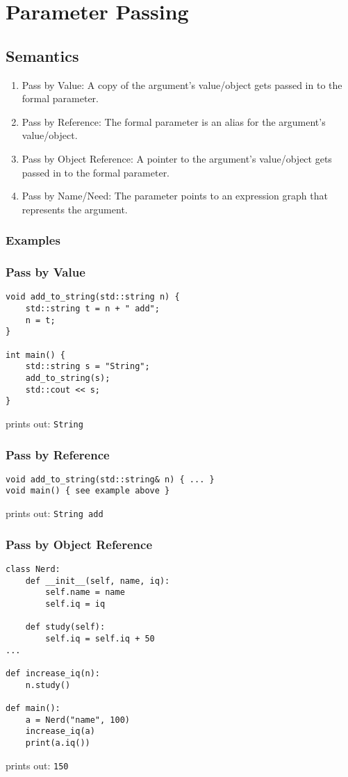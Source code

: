 \documentclass{article}
\begin{document}
\section{Parameter Passing}
\subsection{Semantics}
\begin{enumerate}[label=(\roman*)]
\item Pass by Value: A copy of the argument's value/object gets passed
  in to the formal parameter.
\item Pass by Reference: The formal parameter is an alias for the
  argument's value/object.
\item Pass by Object Reference: A pointer to the argument's
  value/object gets passed in to the formal parameter.
\item Pass by Name/Need: The parameter points to an expression graph
  that represents the argument.
\end{enumerate}

\subsubsection{Examples}
\subsubsection*{Pass by Value}
\begin{verbatim}
void add_to_string(std::string n) {
    std::string t = n + " add";
    n = t;
}

int main() {
    std::string s = "String";
    add_to_string(s);
    std::cout << s;
}
\end{verbatim}
prints out: \texttt{String}

\subsubsection*{Pass by Reference}
\begin{verbatim}
void add_to_string(std::string& n) { ... }
void main() { see example above }
\end{verbatim}
prints out: \texttt{String add}

\subsubsection*{Pass by Object Reference}
\begin{verbatim}
class Nerd:
    def __init__(self, name, iq):
        self.name = name
        self.iq = iq

    def study(self):
        self.iq = self.iq + 50
...

def increase_iq(n):
    n.study()

def main():
    a = Nerd("name", 100)
    increase_iq(a)
    print(a.iq())
\end{verbatim}
prints out: \texttt{150}
\end{document}

